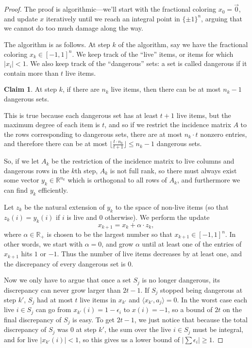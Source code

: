 \documentclass{article}
\theoremstyle{theorem}
\theoremstyle{definition}
\newtheorem{claim}{Claim}
\newcommand{\R}{\mathbb{R}}
\newcommand{\iprod}[1]{\langle #1 \rangle}
\begin{document}
\begin{proof}
    The proof is algorithmic---we'll start with the fractional coloring $x_0 = \vec{0}$, and update $x$ iteratively until we reach an integral point in $\{\pm 1\}^n$, arguing that we cannot do too much damage along the way.

    The algorithm is as follows.
    At step $k$ of the algorithm, say we have the fractional coloring $x_k \in [-1,1]^n$.
    We keep track of the ``live'' items, or items for which $|x_i| < 1$.
    We also keep track of the ``dangerous'' sets: a set is called dangerous if it contain more than $t$ live items.
    \begin{claim}
	At step $k$, if there are $n_k$ live items, then there can be at most $n_k - 1$ dangerous sets.
    \end{claim}
    This is true because each dangerous set has at least $t+1$ live items, but the maximum degree of each item is $t$, and so if we restrict the incidence matrix $A$ to the rows corresponding to dangerous sets, there are at most $n_k\cdot t$ nonzero entries, and therefore there can be at most $\lfloor\frac{t\cdot n_k}{t+1}\rfloor \le n_k-1$ dangerous sets.

    So, if we let $A_k$ be the restriction of the incidence matrix to live columns and dangerous rows in the $k$th step, $A_k$ is not full rank, so there must always exist some vector $y_k \in \R^{n_k}$ which is orthogonal to all rows of $A_k$, and furthermore we can find $y_k$ efficiently.

    Let $z_k$ be the natural extension of $y_k$ to the space of non-live items (so that $z_k(i) = y_k(i)$ if $i$ is live and $0$ otherwise).
    We perform the update
    \[
	x_{k+1} = x_k + \alpha \cdot z_k,
    \]
where $\alpha \in \R_+$ is chosen to be the largest number so that $x_{k+1} \in [-1,1]^n$.
    In other words, we start with $\alpha = 0$, and grow $\alpha$ until at least one of the entries of $x_{k+1}$ hits $1$ or $-1$.
    Thus the number of live items decreases by at least one, and the discrepancy of every dangerous set is $0$.

    Now we only have to argue that once a set $S_j$ is no longer dangerous, its discrepancy can never grow larger than $2t-1$.
    If $S_j$ stopped being dangerous at step $k'$, $S_j$ had at most $t$ live items in $x_{k'}$ and $\iprod{x_{k'},a_j} = 0$.
    In the worst case each live $i \in S_j$ can go from $x_{k'}(i) = 1-\epsilon_i$ to $x(i) = -1$, so a bound of $2t$ on the final discrepancy of $S_j$ is easy.
    To get $2t-1$, we just notice that because the total discrepancy of $S_j$ was $0$ at step $k'$, the sum over the live $i \in S_j$ must be integral, and for live $|x_{k'}(i)| < 1$, so this gives us a lower bound of $\left|\sum \epsilon_i\right| \ge 1$.
\end{proof}
\end{document}
